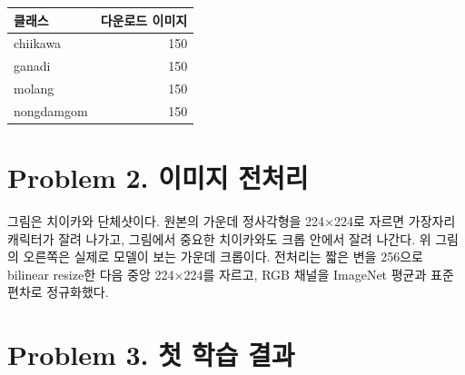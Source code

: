 \documentclass[11pt]{article}
\begin{document}
\begin{center}\footnotesize
\begin{tabular}{lr}
\toprule
클래스 & 다운로드 이미지 \\
\midrule
chiikawa & 150 \\
ganadi & 150 \\
molang & 150 \\
nongdamgom & 150 \\
\bottomrule
\end{tabular}
\end{center}

\section*{Problem 2. 이미지 전처리}


그림은 치이카와 단체샷이다. 원본의 가운데 정사각형을 224×224로 자르면
가장자리 캐릭터가 잘려 나가고, 그림에서 중요한 치이카와도 크롭 안에서
잘려 나간다. 위 그림의 오른쪽은 실제로 모델이 보는 가운데 크롭이다.
전처리는 짧은 변을 256으로 bilinear resize한 다음 중앙 224×224를 자르고,
RGB 채널을 ImageNet 평균과 표준편차로 정규화했다.

\section*{Problem 3. 첫 학습 결과}

\begin{center}\footnotesize
{}
\end{center}
\end{document}
